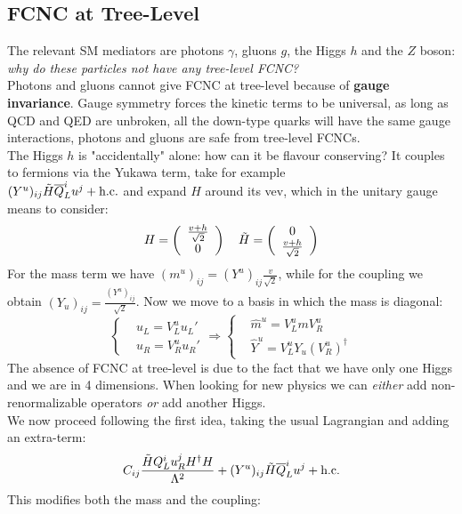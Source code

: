 \documentclass[../main.tex]{subfiles}
\begin{document}
\subsection{FCNC at Tree-Level}
The relevant SM mediators are photons $\gamma$, gluons $g$, the Higgs $h$ and the $Z$ boson: \textit{why do these particles not have any tree-level FCNC?}\\
Photons and gluons cannot give FCNC at tree-level because of \textbf{gauge invariance}. Gauge symmetry forces the kinetic terms to be universal, as long as QCD and QED are unbroken, all the down-type quarks will have the same gauge interactions, photons and gluons are safe from tree-level FCNCs.\\
The Higgs $h$ is "accidentally" alone: how can it be flavour conserving? It couples to fermions via the Yukawa term, take for example\\ $(Y^u)_{ij}\Tilde{H}\overline{Q}_L^iu^j+\text{h.c.}$ and expand $H$ around its vev, which in the unitary gauge means to consider:
\[
H=\left(\begin{array}{c}
    \frac{v+h}{\sqrt{2}} \\
    0
\end{array}\right)
\quad
\Tilde{H}=\left(\begin{array}{c}
    0\\
    \frac{v+h}{\sqrt{2}}
\end{array}\right)
\]
For the mass term we have $(m^u)_{ij}=(Y^u)_{ij}\frac{v}{\sqrt{2}}$, while for the coupling we obtain $(Y_u)_{ij}=\frac{(Y^u)_{ij}}{\sqrt{2}}$. Now we move to a basis in which the mass is diagonal:
\[
\left\{
\begin{aligned}
&u_L=V_L^uu_L'\\
&u_R=V_R^uu_R'
\end{aligned}
\right.
\Rightarrow
\left\{
\begin{aligned}
&\hat{m}^u=V_L^umV_R^u\\
&\hat{Y}^u=V_L^uY_u(V_R^u)^\dagger
\end{aligned}
\right.
\]
The absence of FCNC at tree-level is due to the fact that we have only one Higgs and we are in 4 dimensions. When looking for new physics we can \textit{either} add non-renormalizable operators \textit{or} add another Higgs.\\
We now proceed following the first idea, taking the usual Lagrangian and adding an extra-term:
\[
C_{ij}\frac{\Tilde{H}Q_L^iu_R^jH^\dagger H}{\Lambda^2}+(Y^u)_{ij}\Tilde{H}\overline{Q}_L^iu^j+\text{h.c.}
\]
This modifies both the mass and the coupling:
\end{document}

